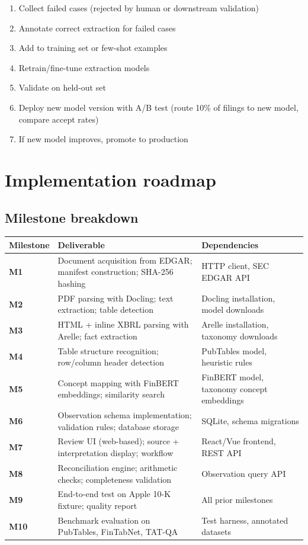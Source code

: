 \begin{enumerate}
\item Collect failed cases (rejected by human or downstream validation)
\item Annotate correct extraction for failed cases
\item Add to training set or few-shot examples
\item Retrain/fine-tune extraction models
\item Validate on held-out set
\item Deploy new model version with A/B test (route 10\% of filings to new model,
  compare accept rates)
\item If new model improves, promote to production
\end{enumerate}

\section{Implementation roadmap}

\subsection{Milestone breakdown}

\begin{longtable}{L{20mm}L{45mm}L{71mm}}
\toprule Milestone & Deliverable & Dependencies\\\midrule\endhead
\textbf{M1} & Document acquisition from EDGAR; manifest construction; SHA-256 hashing &
HTTP client, SEC EDGAR API\\
\textbf{M2} & PDF parsing with Docling; text extraction; table detection &
Docling installation, model downloads\\
\textbf{M3} & HTML + inline XBRL parsing with Arelle; fact extraction &
Arelle installation, taxonomy downloads\\
\textbf{M4} & Table structure recognition; row/column header detection &
PubTables model, heuristic rules\\
\textbf{M5} & Concept mapping with FinBERT embeddings; similarity search &
FinBERT model, taxonomy concept embeddings\\
\textbf{M6} & Observation schema implementation; validation rules; database storage &
SQLite, schema migrations\\
\textbf{M7} & Review UI (web-based); source + interpretation display; workflow &
React/Vue frontend, REST API\\
\textbf{M8} & Reconciliation engine; arithmetic checks; completeness validation &
Observation query API\\
\textbf{M9} & End-to-end test on Apple 10-K fixture; quality report &
All prior milestones\\
\textbf{M10} & Benchmark evaluation on PubTables, FinTabNet, TAT-QA &
Test harness, annotated datasets\\\bottomrule
\end{longtable}

